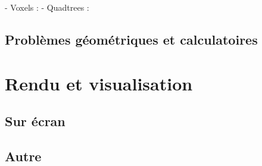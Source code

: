 \documentclass[french,12pt]{article}
\begin{document}
- Voxels : \cite{kaufman_volume_1993}
- Quadtrees : \cite{eppstein_skip_2008}
\subsection{Problèmes géométriques et calculatoires}

\section{Rendu et visualisation}
\cite{hortner_spaxels_2012}
\subsection{Sur écran}
\subsection{Autre}
\printbibliography
\end{document}
